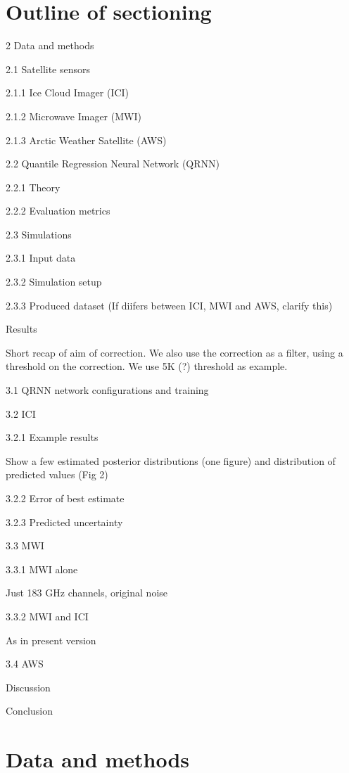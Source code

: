 \documentclass[amt, manuscript]{copernicus}
\begin{document}





\newpage

\section*{Outline of sectioning}

2 Data and methods

2.1 Satellite sensors

2.1.1 Ice Cloud Imager (ICI)

2.1.2 Microwave Imager (MWI)

2.1.3 Arctic Weather Satellite (AWS)

2.2 Quantile Regression Neural Network (QRNN)

2.2.1 Theory

2.2.2 Evaluation metrics

2.3 Simulations

2.3.1 Input data

2.3.2 Simulation setup

2.3.3 Produced dataset
(If diifers between ICI, MWI and AWS, clarify this)

 Results

Short recap of aim of correction. We also use the correction as a filter, using
a threshold on the correction. We use 5K (?) threshold as example.

3.1 QRNN network configurations and training

3.2 ICI

3.2.1 Example results

Show a few estimated posterior distributions (one figure) and distribution of
predicted values (Fig 2)

3.2.2 Error of best estimate

3.2.3 Predicted uncertainty

3.3 MWI

3.3.1 MWI alone

Just 183 GHz channels, original noise

3.3.2 MWI and ICI

As in present version

3.4 AWS

 Discussion

 Conclusion


\newpage
\section{Data and methods}
\end{document}
